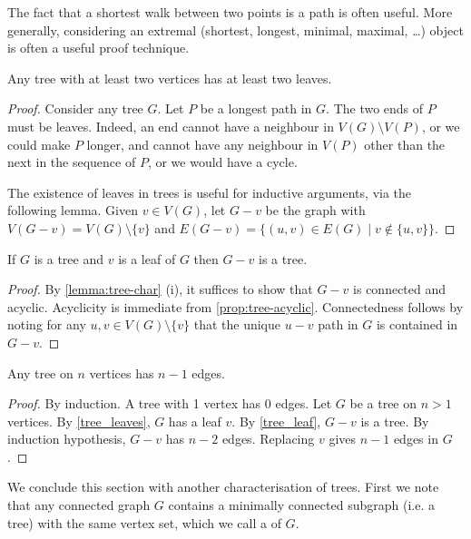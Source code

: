 \begin{remark}
The fact that a shortest walk between two points is a path is often useful. More generally, considering an extremal (shortest, longest, minimal, maximal, \dots) object is often a useful proof technique.
\end{remark}

\begin{lemma}\label{tree_leaves}
Any tree with at least two vertices has at least two leaves.
\end{lemma}
\begin{proof}
Consider any tree $G$. Let $P$ be a longest path in $G$. The two ends of $P$ must be leaves. Indeed, an end cannot have a neighbour in $V(G) \setminus V(P)$, or we could make $P$ longer, and cannot have any neighbour in $V(P)$ other than the next in the sequence of $P$, or we would have a cycle.

The existence of leaves in trees is useful for inductive arguments, via the following lemma. Given $v \in V(G)$, let $G-v$ be the graph with $V(G-v) = V(G)\setminus\{v\}$ and $E(G-v) = \{(u,v) \in E(G) \mid v \notin \{u,v\}\}$.
\end{proof}

\begin{lemma}\label{tree_leaf}
If $G$ is a tree and $v$ is a leaf of $G$ then $G-v$ is a tree.
\end{lemma}
\begin{proof}
By \cref{lemma:tree-char} (i), it suffices to show that $G-v$ is connected and acyclic. Acyclicity is immediate from \cref{prop:tree-acyclic}. Connectedness follows by noting for any $u,v \in V(G)\setminus\{v\}$ that the unique $u-v$ path in $G$ is contained in $G-v$.
\end{proof}

\begin{lemma}\label{tree_edges}
Any tree on $n$ vertices has $n-1$ edges.
\end{lemma}
\begin{proof}
By induction. A tree with 1 vertex has 0 edges. Let $G$ be a tree on $n>1$ vertices. By \cref{tree_leaves}, $G$ has a leaf $v$. By \cref{tree_leaf}, $G-v$ is a tree. By induction hypothesis, $G-v$ has $n-2$ edges. Replacing $v$ gives $n-1$ edges in $G$.
\end{proof}

We conclude this section with another characterisation of trees. First we note that any connected graph $G$ contains a minimally connected subgraph (i.e. a tree) with the same vertex set, which we call a  of $G$.

